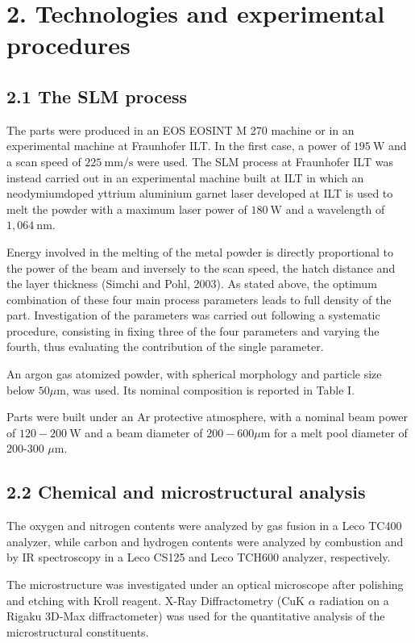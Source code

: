 \documentclass[10pt]{article}
\begin{document}
\section*{2. Technologies and experimental procedures}
\subsection*{2.1 The SLM process}
The parts were produced in an EOS EOSINT M 270 machine or in an experimental machine at Fraunhofer ILT. In the first case, a power of $195 \mathrm{~W}$ and a scan speed of $225 \mathrm{~mm} / \mathrm{s}$ were used. The SLM process at Fraunhofer ILT was instead carried out in an experimental machine built at ILT in which an neodymiumdoped yttrium aluminium garnet laser developed at ILT is used to melt the powder with a maximum laser power of $180 \mathrm{~W}$ and a wavelength of $1,064 \mathrm{~nm}$.

Energy involved in the melting of the metal powder is directly proportional to the power of the beam and inversely to the scan speed, the hatch distance and the layer thickness (Simchi and Pohl, 2003). As stated above, the optimum combination of these four main process parameters leads to full density of the part. Investigation of the parameters was carried out following a systematic procedure, consisting in fixing three of the four parameters and varying the fourth, thus evaluating the contribution of the single parameter.

An argon gas atomized powder, with spherical morphology and particle size below $50 \mu \mathrm{m}$, was used. Its nominal composition is reported in Table I.

Parts were built under an Ar protective atmosphere, with a nominal beam power of $120-200 \mathrm{~W}$ and a beam diameter of $200-600 \mu \mathrm{m}$ for a melt pool diameter of 200-300 $\mu \mathrm{m}$.

\subsection*{2.2 Chemical and microstructural analysis}
The oxygen and nitrogen contents were analyzed by gas fusion in a Leco TC400 analyzer, while carbon and hydrogen contents were analyzed by combustion and by IR spectroscopy in a Leco CS125 and Leco TCH600 analyzer, respectively.

The microstructure was investigated under an optical microscope after polishing and etching with Kroll reagent. X-Ray Diffractometry (CuK $\alpha$ radiation on a Rigaku 3D-Max diffractometer) was used for the quantitative analysis of the microstructural constituents.
\end{document}
